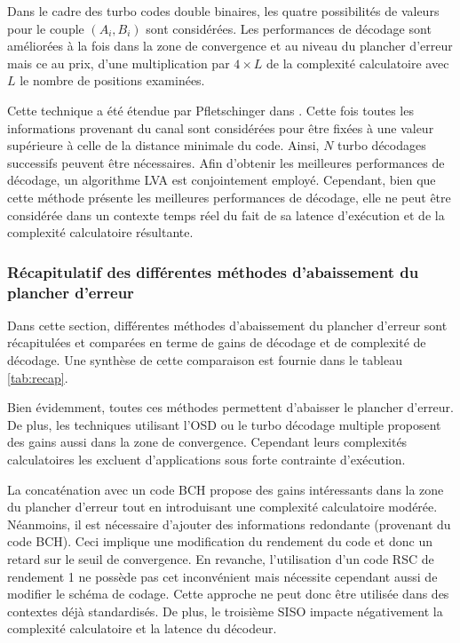 Dans le cadre des turbo codes double binaires, les quatre possibilités de valeurs pour le couple $(A_i,B_i)$ sont considérées. Les performances de décodage sont améliorées à la fois dans la zone de convergence et au niveau du plancher d'erreur mais ce au prix, 
d'une multiplication par $4\times L$ de la complexité calculatoire avec $L$ le nombre de positions examinées.

Cette technique a été étendue par Pfletschinger dans \cite{pflet}. Cette fois toutes les informations provenant du canal sont considérées pour être fixées à une valeur supérieure à celle de la distance minimale du code. Ainsi, $N$ turbo décodages successifs peuvent être nécessaires. Afin d'obtenir les meilleures performances de décodage, un algorithme LVA est conjointement employé. Cependant, bien que cette méthode présente les meilleures performances de décodage, elle ne peut être considérée dans un contexte temps réel du fait de sa latence d'exécution et de la complexité calculatoire résultante.

\subsubsection{Récapitulatif des différentes méthodes d'abaissement du plancher d'erreur}
Dans cette section, différentes méthodes d'abaissement du plancher d'erreur sont récapitulées et comparées en terme de gains de décodage et de complexité de décodage. Une synthèse de cette comparaison est fournie dans le tableau \ref{tab:recap}.

Bien évidemment, toutes ces méthodes permettent d'abaisser le plancher d'erreur. De plus, les techniques utilisant l'OSD ou le turbo décodage multiple proposent des gains aussi dans la zone de convergence. Cependant leurs complexités calculatoires les excluent d'applications sous forte contrainte d'exécution. 

La concaténation avec un code BCH propose des gains intéressants dans la zone du plancher d'erreur tout en introduisant une complexité calculatoire modérée. Néanmoins, il est nécessaire d'ajouter des informations redondante (provenant du code BCH). Ceci implique une modification du rendement du code et donc un retard sur le seuil de convergence. 
En revanche, l'utilisation d'un code RSC de rendement 1 ne possède pas cet inconvénient mais nécessite cependant aussi de modifier le schéma de codage. Cette approche ne peut donc être utilisée dans des contextes déjà standardisés. De plus, le troisième SISO impacte négativement la complexité calculatoire et la latence du décodeur.

